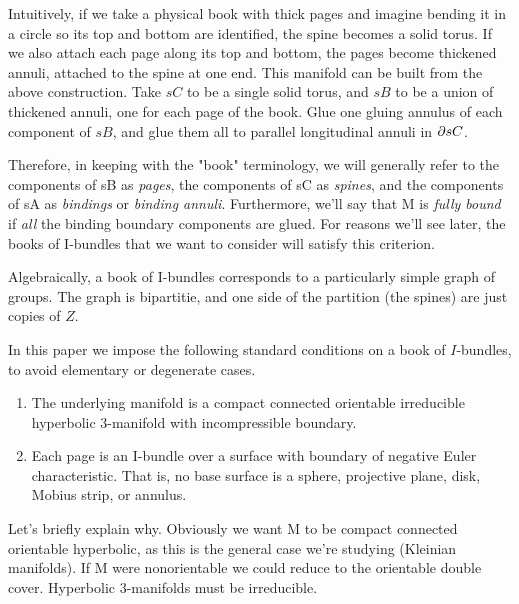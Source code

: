 
Intuitively, if we take a physical book with thick pages and imagine bending it
in a circle so its top and bottom are identified, the spine becomes a solid
torus.  If we also attach each page along its top and bottom, the pages become
thickened annuli, attached to the spine at one end. This manifold can be built
from the above construction. Take $sC$ to be a single solid torus, and $sB$ to
be a union of thickened annuli, one for each page of the book. Glue one gluing
annulus of each component of $sB$, and glue them all to parallel longitudinal
annuli in $\partial sC$.

Therefore, in keeping with the "book" terminology, we will generally refer to
the components of sB as \emph{pages}, the components of sC as \emph{spines},
and the components of sA as \emph{bindings} or \emph{binding annuli}.
Furthermore, we'll say that M is \emph{fully bound} if \emph{all} the binding
boundary components are glued. For reasons we'll see later, the books of
I-bundles that we want to consider will satisfy this criterion.

Algebraically, a book of I-bundles corresponds to a particularly simple graph
of groups. The graph is bipartitie, and one side of the partition (the spines)
are just copies of $Z$.

In this paper we impose the following standard conditions on a book of
$I$-bundles, to avoid elementary or degenerate cases.

\begin{enumerate}

\item The underlying manifold is a compact connected orientable irreducible
hyperbolic 3-manifold with incompressible boundary.

\item Each page is an I-bundle over a surface with boundary of negative Euler
characteristic.  That is, no base surface is a sphere, projective plane, disk,
Mobius strip, or annulus.

\end{enumerate}

Let's briefly explain why. Obviously we want M to be compact connected
orientable hyperbolic, as this is the general case we're studying (Kleinian
manifolds). If M were nonorientable we could reduce to the orientable double
cover. Hyperbolic 3-manifolds must be irreducible.

